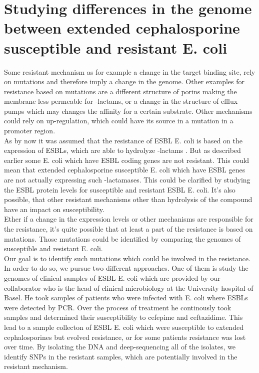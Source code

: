 \section{Studying differences in the genome between extended cephalosporine susceptible and resistant E. coli}
Some resistant mechanism as for example a change in the target binding site, rely on mutations and therefore imply a change in the genome. Other examples for resistance based on mutations are a different structure of porins making the membrane less permeable for \textbeta-lactams, or a change in the structure of efflux pumps which may changes the affinity for a certain substrate. Other mechanisms could rely on up-regulation, which could have its source in a mutation in a promoter region. \\
As by now it was assumed that the resistance of ESBL E. coli is based on the expression of ESBLs, which are able to hydrolyze \textbeta-lactams \cite{shaikh_antibiotic_2015}. But as described earlier some E. coli which have ESBL coding genes are not resistant. This could mean that extended cephalosporine susceptible E. coli which have ESBL genes are not actually expressing such \textbeta-lactamases. This could be clarified by studying the ESBL protein levels for susceptible and resistant ESBL E. coli. It's also possible, that other resistant mechanisms other than hydrolysis of the compound have an impact on susceptibility.\\
Ether if a change in the expression levels or other mechanisms are responsible for the resistance, it's quite possible that at least a part of the resistance is based on mutations. Those mutations could be identified by comparing the genomes of susceptible and resistant E. coli. \\
Our goal is to identify such mutations which could be involved in the resistance. In order to do so, we pursue two different approaches. One of them is study the genomes of clinical samples of ESBL E. coli which are provided by our collaborator who is the head of clinical microbiology at the University hospital of Basel. He took samples of patients who were infected with E. coli where ESBLs were detected by PCR. Over the process of treatment he continously took samples and determined their susceptibility to cefepime and ceftazidime. This lead to a sample collecton of ESBL E. coli which were susceptible to extended cephalosporines but evolved resistance, or for some patients resistance was lost over time. By isolating the DNA and deep-sequencing all of the isolates, we identify SNPs in the resistant samples, which are potentially involved in the resistant mechanism. \\

